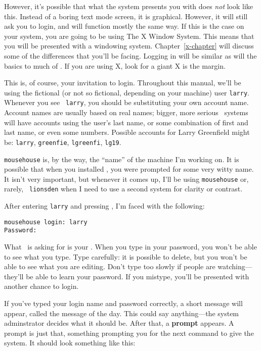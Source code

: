 \xwarn However, it's possible that what the system presents you
with does {\em not\/} look like this. Instead of a boring text mode
screen, it is graphical. However, it will still ask you to login, and
will function mostly the same way.  If this is the case on your
system, you are going to be using The X Window System.  This means that you will be presented with a windowing
system.  Chapter~\ref{x-chapter} will discuss some of the differences
that you'll be facing.  Logging in will be similar as will the basics
to much of \unix. If you are using X, look for a giant X is the
margin.

This is, of course, your invitation to login. Throughout
this manual, we'll be using the fictional (or not so fictional,
depending on your machine) user {\tt larry}.  Whenever you see {\tt
  larry}, you should be substituting your own account name.  Account
names are usually based on real names; bigger, more serious \unix\ 
systems will have accounts using the user's last name, or some
combination of first and last name, or even some numbers. Possible
accounts for Larry Greenfield might be: {\tt larry}, {\tt greenfie},
{\tt lgreenfi}, {\tt lg19}.

{\tt mousehouse} is, by the way, the ``name'' of the machine I'm
working on. It is possible that when you installed \linux, you were
prompted for some very witty name. It isn't very important, but
whenever it comes up, I'll be using {\tt mousehouse} or, rarely, {\tt
lionsden} when I need to use a second system for clarity or contrast.

After entering {\tt larry} and pressing \ret, I'm faced with the
following:

\begin{screen}\begin{verbatim}
mousehouse login: larry
Password:
\end{verbatim}\end{screen}

What \linux\ is asking for is your . When you type
in your password, you won't be able to see what you type. Type
carefully: it is possible to delete, but you won't be able to see what
you are editing. Don't type too slowly if people are
watching---they'll be able to learn your password.  If you mistype,
you'll be presented with another chance to login.

If you've typed your login name and password correctly, a short
message will appear, called the message of the day.  
 This could say anything---the system adminstrator
decides what it should be.  After that, a {\bf prompt}
appears. A prompt is just that, something
prompting you for the next command to give the system. It should look
something like this:

